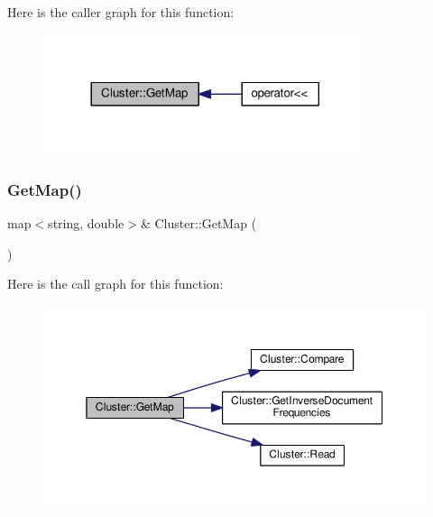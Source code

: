 Here is the caller graph for this function\+:
\nopagebreak
\begin{figure}[H]
\begin{center}
\leavevmode
\includegraphics[width=269pt]{class_cluster_a4e3685824bdd4b01763f8e811000f275_icgraph}
\end{center}
\end{figure}
\mbox{\label{class_cluster_a7c98f2cdd78a833e9033f8a9a5a5a7b0}} 
\subsubsection{\texorpdfstring{Get\+Map()}{GetMap()}\hspace{0.1cm}{\footnotesize\ttfamily [2/2]}}
{\footnotesize\ttfamily map$<$string, double$>$\& Cluster\+::\+Get\+Map (\begin{DoxyParamCaption}{ }\end{DoxyParamCaption})\hspace{0.3cm}{\ttfamily [inline]}}

Here is the call graph for this function\+:
\nopagebreak
\begin{figure}[H]
\begin{center}
\leavevmode
\includegraphics[width=350pt]{class_cluster_a7c98f2cdd78a833e9033f8a9a5a5a7b0_cgraph}
\end{center}
\end{figure}
\mbox{\label{class_cluster_ad9132f66736e8f170eb7746f9cd482d0}} 
